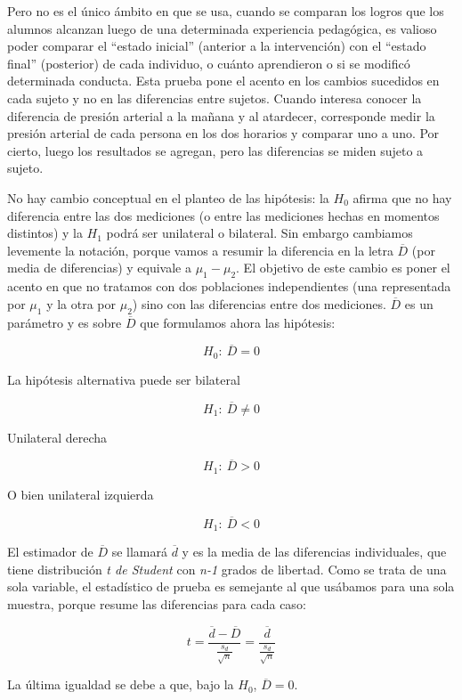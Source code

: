 \documentclass[]{book}
\begin{document}
Pero no es el único ámbito en que se usa, cuando se comparan los logros
que los alumnos alcanzan luego de una determinada experiencia
pedagógica, es valioso poder comparar el ``estado inicial'' (anterior a la
intervención) con el ``estado final'' (posterior) de cada individuo, o
cuánto aprendieron o si se modificó determinada conducta. Esta prueba
pone el acento en los cambios sucedidos en cada sujeto y no en las
diferencias entre sujetos. Cuando interesa conocer la diferencia de
presión arterial a la mañana y al atardecer, corresponde medir la
presión arterial de cada persona en los dos horarios y comparar uno a
uno. Por cierto, luego los resultados se agregan, pero las diferencias
se miden sujeto a sujeto.

No hay cambio conceptual en el planteo de las hipótesis: la \(H_0\) afirma que no hay diferencia entre las dos mediciones (o entre las mediciones hechas en momentos distintos) y la \(H_1\) podrá ser unilateral o bilateral. Sin embargo cambiamos levemente la notación, porque vamos a resumir la diferencia en la letra \(\overline{D}\) (por media de diferencias) y equivale a \(\mu_{1} - \mu_{2}\). El objetivo de este cambio es poner el acento en que no tratamos con dos poblaciones
independientes (una representada por \(\mu_{1}\) y la otra por \(\mu_{2}\))
sino con las diferencias entre dos mediciones. \(\overline{D}\) es un
parámetro y es sobre \(\overline{D}\) que formulamos ahora las hipótesis:

\[H_{0}:\ \overline{D} = 0\]

La hipótesis alternativa puede ser bilateral

\[H_{1}:\ \overline{D} \neq 0\]

Unilateral derecha

\[H_{1}:\ \overline{D} > 0\]

O bien unilateral izquierda

\[H_{1}:\ \overline{D} < 0\]

El estimador de \(\overline{D}\) se llamará \(\overline{d}\) y es la media
de las diferencias individuales, que tiene distribución \emph{t de Student}
con \emph{n-1} grados de libertad. Como se trata de una sola variable, el
estadístico de prueba es semejante al que usábamos para una sola
muestra, porque resume las diferencias para cada caso:

\[t = \frac{\overline{d} - \overline{D}}{\frac{s_{d}}{\sqrt{n}}} = \frac{\overline{d}}{\frac{s_{d}}{\sqrt{n}}}\]

La última igualdad se debe a que, bajo la \(H_0\), \(\overline{D} = 0\).
\end{document}
